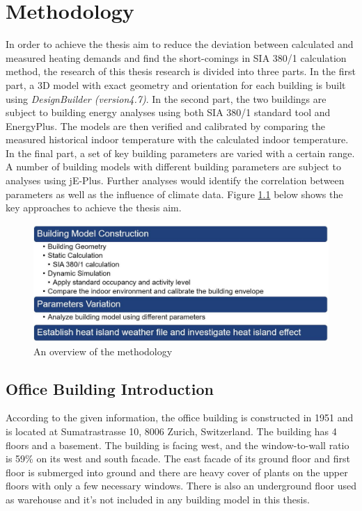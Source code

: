 \documentclass[a4paper, oneside]{discothesis}
\begin{document}
\chapter{Methodology}
	In order to achieve the thesis aim to reduce the deviation between calculated and measured heating demands and find the short-comings in SIA 380/1 calculation method, the research of this thesis research is divided into three parts. In the first part, a 3D model with exact geometry and orientation for each building is built using \textit{DesignBuilder (version4.7)}. In the second part, the two buildings are subject to building energy analyses using both SIA 380/1 standard tool and EnergyPlus. The models are then verified and calibrated by comparing the measured historical indoor temperature with the calculated indoor temperature. In the final part, a set of key building parameters are varied with a certain range. A number of building models with different building parameters are subject to analyses using jE-Plus. Further analyses would identify the correlation between parameters as well as the influence of climate data. Figure \ref{fig:overview} below shows the key approaches to achieve the thesis aim.\\

		\begin{figure}[ht]
		\centering
		\includegraphics[scale=0.5]{overview.JPG}
		\caption{An overview of the methodology}
		\label{fig:overview}
		\end{figure}

	\section{Office Building Introduction}
		

		 
		
		According to the given information, the office building is constructed in 1951 and is located at Sumatrastrasse 10, 8006 Zurich, Switzerland. The building has 4 floors and a basement. The building  is facing west, and the window-to-wall ratio is 59\% on its west and south facade. The east facade of its ground floor and first floor is submerged into ground and there are heavy cover of plants on the upper floors with only a few necessary windows. There is also an underground floor used as warehouse and it's not included in any building model in this thesis.\\
\end{document}
